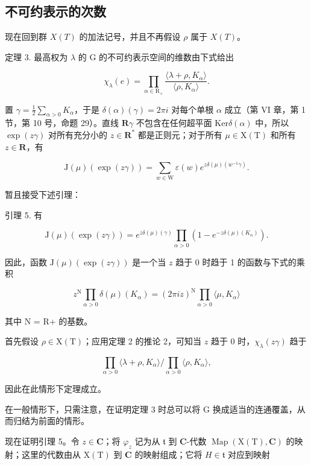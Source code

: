 \subsection{不可约表示的次数}

现在回到群 \(X(T)\) 的加法记号，并且不再假设 \(\rho\) 属于 \(X(T)\)。

定理 3. 最高权为 \(\lambda\) 的 G 的不可约表示空间的维数由下式给出

\[
\chi_ {\lambda} (e) = \prod_ {\alpha \in \mathrm{R} _ {+}} \frac {\langle \lambda + \rho , K _ {\alpha} \rangle}{\langle \rho , K _ {\alpha} \rangle}.
\]

置 \(\gamma = \frac{1}{2}\sum_{\alpha >0}K_{\alpha}\)，于是 \(\delta (\alpha)(\gamma) = 2\pi i\) 对每个单根 \(\alpha\) 成立（第 VI 章，第 1 节，第 10 号，命题 29）。直线 \(\mathbf{R}\gamma\) 不包含在任何超平面 \(\mathrm{Ker}\delta (\alpha)\) 中，所以 \(\exp (z\gamma)\) 对所有充分小的 \(z\in \mathbf{R}^*\) 都是正则元；对于所有 \(\mu \in \mathrm{X(T)}\) 和所有 \(z\in \mathbf{R}\)，有

\[
\mathrm{J} (\mu) (\exp (z \gamma)) = \sum_ {w \in \mathrm{W}} \varepsilon (w) e ^ {z \delta (\mu) (w ^ {- 1} \gamma)}.
\]

暂且接受下述引理：

引理 5. 有

\[
\mathrm{J} (\mu) (\exp (z \gamma)) = e ^ {z \delta (\mu) (\gamma)} \prod_ {\alpha > 0} (1 - e ^ {- z \delta (\mu) (K _ {\alpha})}).
\]

因此，函数 \(\mathrm{J}(\mu)(\exp (z\gamma))\) 是一个当 \(z\) 趋于 0 时趋于 1 的函数与下式的乘积

\[
z ^ {\mathrm{N}} \prod_ {\alpha > 0} \delta (\mu) (K _ {\alpha}) = (2 \pi i z) ^ {\mathrm{N}} \prod_ {\alpha > 0} \langle \mu , K _ {\alpha} \rangle
\]

其中 N = R+ 的基数。

首先假设 \(\rho \in \mathrm{X(T)}\)；应用定理 2 的推论 2，可知当 \(z\) 趋于 0 时，\(\chi_{\lambda}(z\gamma)\) 趋于

\[
\prod_ {\alpha > 0} \langle \lambda + \rho , K _ {\alpha} \rangle / \prod_ {\alpha > 0} \langle \rho , K _ {\alpha} \rangle ,
\]

因此在此情形下定理成立。

在一般情形下，只需注意，在证明定理 3 时总可以将 G 换成适当的连通覆盖，从而归结为前面的情形。

现在证明引理 5。令 \(z \in \mathbf{C}\)；将 \(\varphi_z\) 记为从 \(\mathfrak{t}\) 到 \(\mathbf{C}\)-代数 \(\operatorname{Map}(\mathrm{X}(\mathrm{T}), \mathbf{C})\) 的映射；这里的代数由从 \(\mathrm{X}(\mathrm{T})\) 到 \(\mathbf{C}\) 的映射组成；它将 \(H \in \mathfrak{t}\) 对应到映射

